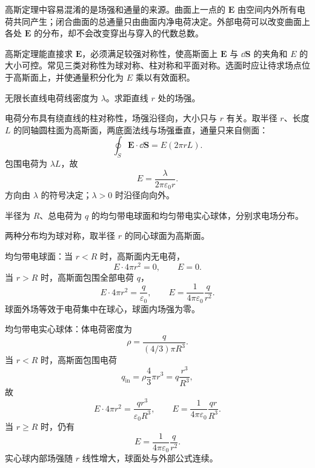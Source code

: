 高斯定理中容易混淆的是场强和通量的来源。曲面上一点的 $\bm E$ 由空间内外所有电荷共同产生；闭合曲面的总通量只由曲面内净电荷决定。外部电荷可以改变曲面上各处 $\bm E$ 的分布，却不会改变穿出与穿入的代数总数。


\begin{method}[用高斯定理求场强]
高斯定理能直接求 $\bm E$，必须满足较强对称性，使高斯面上 $\bm E$ 与 $\dd\bm S$ 的夹角和 $E$ 的大小可控。常见三类对称性为球对称、柱对称和平面对称。选面时应让待求场点位于高斯面上，并使通量积分化为 $E$ 乘以有效面积。
\end{method}

\begin{example}[title={无限长均匀带电直线的场强}]\label{eg:line-gauss}
无限长直线电荷线密度为 $\lambda$。求距直线 $r$ 处的场强。
\begin{solution}
电荷分布具有绕直线的柱对称性，场强沿径向，大小只与 $r$ 有关。取半径 $r$、长度 $L$ 的同轴圆柱面为高斯面，两底面法线与场强垂直，通量只来自侧面：
\[
  \oint_S \bm E\cdot\dd\bm S=E(2\pi rL).
\]
包围电荷为 $\lambda L$，故
\[
  E=\frac{\lambda}{2\pi\varepsilon_0 r}.
\]
方向由 $\lambda$ 的符号决定；$\lambda>0$ 时沿径向向外。
\end{solution}
\end{example}

\begin{example}[title={均匀带电球面与均匀带电球体}]\label{eg:sphere-gauss}
半径为 $R$、总电荷为 $q$ 的均匀带电球面和均匀带电实心球体，分别求电场分布。
\begin{solution}
两种分布均为球对称，取半径 $r$ 的同心球面为高斯面。

均匀带电球面：当 $r<R$ 时，高斯面内无电荷，
\[
  E\cdot 4\pi r^2=0,\qquad E=0.
\]
当 $r>R$ 时，高斯面包围全部电荷 $q$，
\[
  E\cdot4\pi r^2=\frac{q}{\varepsilon_0},\qquad
  E=\frac{1}{4\pi\varepsilon_0}\frac{q}{r^2}.
\]
球面外场等效于电荷集中在球心，球面内场强为零。

均匀带电实心球体：体电荷密度为
\[
  \rho=\frac{q}{(4/3)\pi R^3}.
\]
当 $r<R$ 时，高斯面包围电荷
\[
  q_{\mathrm{in}}=\rho\frac{4}{3}\pi r^3=q\frac{r^3}{R^3},
\]
故
\[
  E\cdot4\pi r^2=\frac{q r^3}{\varepsilon_0R^3},\qquad
  E=\frac{1}{4\pi\varepsilon_0}\frac{q r}{R^3}.
\]
当 $r\ge R$ 时，仍有
\[
  E=\frac{1}{4\pi\varepsilon_0}\frac{q}{r^2}.
\]
实心球内部场强随 $r$ 线性增大，球面处与外部公式连续。
\end{solution}
\end{example}

